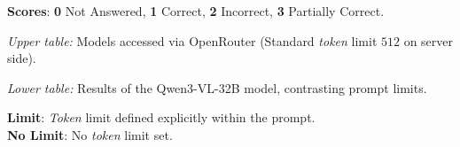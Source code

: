 \begin{table}[H]
\begin{threeparttable}
        \begin{tablenotes}\footnotesize
            \item \textbf{Scores}: \textbf{0} Not Answered, \textbf{1} Correct, \textbf{2} Incorrect, \textbf{3} Partially Correct.
            \item \textit{Upper table:} Models accessed via OpenRouter (Standard \textit{token} limit $512$ on server side).
            \item \textit{Lower table:} Results of the Qwen3-VL-32B model, contrasting prompt limits.
            \item \textbf{Limit}: \textit{Token} limit defined explicitly within the prompt.\\ \textbf{No Limit}: No \textit{token} limit set.
        \end{tablenotes}
    \end{threeparttable}
\end{table}

